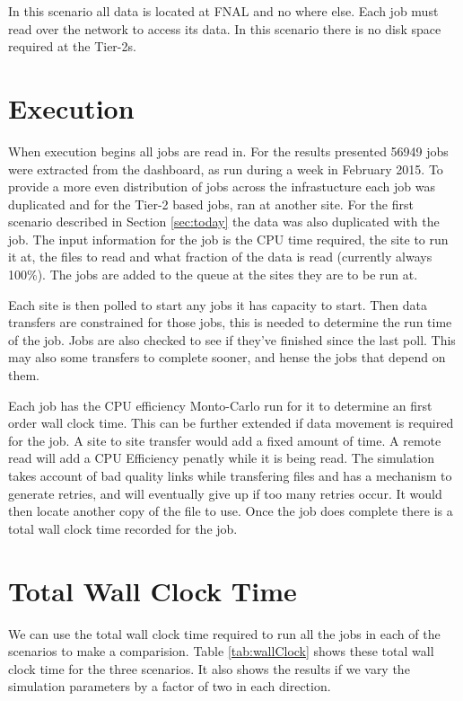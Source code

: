 \documentclass[a4paper]{jpconf}
\begin{document}
In this scenario all data is located at FNAL and no where else. Each
job must read over the network to access its data. In this scenario
there is no disk space required at the Tier-2s.

\section{Execution}

When execution begins all jobs are read in. For the results presented
56949 jobs were extracted from the dashboard, as run during a week in
February 2015. To provide a more even distribution of jobs across the
infrastucture each job was duplicated and for the Tier-2 based jobs,
ran at another site. For the first scenario described in Section
\ref{sec:today} the data was also duplicated with the job. The input
information for the job is the CPU time required, the site to run it
at, the files to read and what fraction of the data is read (currently
always 100\%). The jobs are added to the queue at the sites they are
to be run at.

Each site is then polled to start any jobs it has capacity to
start. Then data transfers are constrained for those jobs, this is
needed to determine the run time of the job. Jobs are also checked to
see if they've finished since the last poll. This may also some
transfers to complete sooner, and hense the jobs that depend on them.

Each job has the CPU efficiency Monto-Carlo run for it to determine an
first order wall clock time. This can be further extended if data
movement is required for the job. A site to site transfer would add a
fixed amount of time. A remote read will add a CPU Efficiency penatly
while it is being read. The simulation takes account of bad quality
links while transfering files and has a mechanism to generate retries,
and will eventually give up if too many retries occur. It would then
locate another copy of the file to use. Once the job does complete
there is a total wall clock time recorded for the job.

\section{Total Wall Clock Time}

We can use the total wall clock time required to run all the jobs in
each of the scenarios to make a comparision. Table \ref{tab:wallClock}
shows these total wall clock time for the three scenarios. It also
shows the results if we vary the simulation parameters by a factor of
two in each direction.
\end{document}
